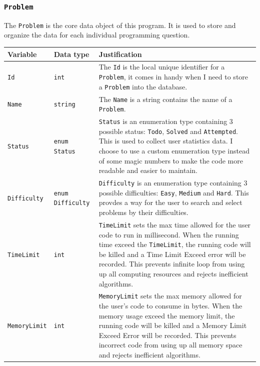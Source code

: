 \documentclass[a4paper]{report}
\begin{document}
\subsubsection{\texttt{Problem}}

The \texttt{Problem} is the core data object of this program. It is used to store and organize the data for each individual programming question.

\begin{tabulary}{\textwidth}{|l|l|L|}
      \hline
      Variable & Data type & Justification \\
      \hline
      \texttt{Id} & \texttt{int} & The \texttt{Id} is the local unique identifier for a \texttt{Problem}, it comes in handy when I need to store a \texttt{Problem} into the database. \\
      \hline
      \texttt{Name} & \texttt{string} & The \texttt{Name} is a string contains the name of a \texttt{Problem}. \\
      \hline
      \texttt{Status} & \texttt{enum Status} & \texttt{Status} is an enumeration type containing 3 possible status: \texttt{Todo}, \texttt{Solved} and \texttt{Attempted}. This is used to collect user statistics data. I choose to use a custom enumeration type instead of some magic numbers to make the code more readable and easier to maintain. \\
      \hline
      \texttt{Difficulty} & \texttt{enum Difficulty} & \texttt{Difficulty} is an enumeration type containing 3 possible difficulties: \texttt{Easy}, \texttt{Medium} and \texttt{Hard}. This provdes a way for the user to search and select problems by their difficulties. \\
      \hline
      \texttt{TimeLimit} & \texttt{int} & \texttt{TimeLimit} sets the max time allowed for the user code to run in millisecond. When the running time exceed the \texttt{TimeLimit}, the running code will be killed and a Time Limit Exceed error will be recorded. This prevents infinite loop from using up all computing resources and rejects inefficient algorithms. \\
      \hline
      \texttt{MemoryLimit} & \texttt{int} & \texttt{MemoryLimit} sets the max memory allowed for the user's code to consume in bytes. When the memory usage exceed the memory limit, the running code will be killed and a Memory Limit Exceed Error will be recorded. This prevents incorrect code from using up all memory space and rejects inefficient algorithms. \\

\end{tabulary}
\end{document}
